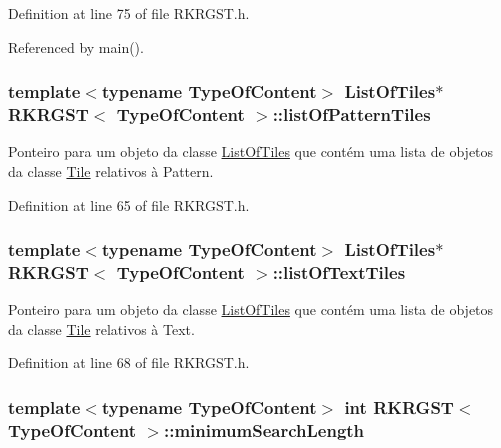 Definition at line 75 of file R\+K\+R\+G\+S\+T.\+h.



Referenced by main().

\hypertarget{classRKRGST_ad2335f6d83faf621a99b66c680f32b5d}{
\subsubsection[{list\+Of\+Pattern\+Tiles}]{\setlength{\rightskip}{0pt plus 5cm}template$<$typename Type\+Of\+Content$>$ {\bf List\+Of\+Tiles}$\ast$ {\bf R\+K\+R\+G\+S\+T}$<$ Type\+Of\+Content $>$\+::list\+Of\+Pattern\+Tiles}}\label{classRKRGST_ad2335f6d83faf621a99b66c680f32b5d}


Ponteiro para um objeto da classe \hyperlink{classListOfTiles}{List\+Of\+Tiles} que contém uma lista de objetos da classe \hyperlink{classTile}{Tile} relativos à Pattern. 



Definition at line 65 of file R\+K\+R\+G\+S\+T.\+h.

\hypertarget{classRKRGST_a03afdb90a534a2420da654ddadb032c2}{
\subsubsection[{list\+Of\+Text\+Tiles}]{\setlength{\rightskip}{0pt plus 5cm}template$<$typename Type\+Of\+Content$>$ {\bf List\+Of\+Tiles}$\ast$ {\bf R\+K\+R\+G\+S\+T}$<$ Type\+Of\+Content $>$\+::list\+Of\+Text\+Tiles}}\label{classRKRGST_a03afdb90a534a2420da654ddadb032c2}


Ponteiro para um objeto da classe \hyperlink{classListOfTiles}{List\+Of\+Tiles} que contém uma lista de objetos da classe \hyperlink{classTile}{Tile} relativos à Text. 



Definition at line 68 of file R\+K\+R\+G\+S\+T.\+h.

\hypertarget{classRKRGST_aaf28410e7b3c34bcfbffd17cd0d014b2}{
\subsubsection[{minimum\+Search\+Length}]{\setlength{\rightskip}{0pt plus 5cm}template$<$typename Type\+Of\+Content$>$ int {\bf R\+K\+R\+G\+S\+T}$<$ Type\+Of\+Content $>$\+::minimum\+Search\+Length}}\label{classRKRGST_aaf28410e7b3c34bcfbffd17cd0d014b2}


